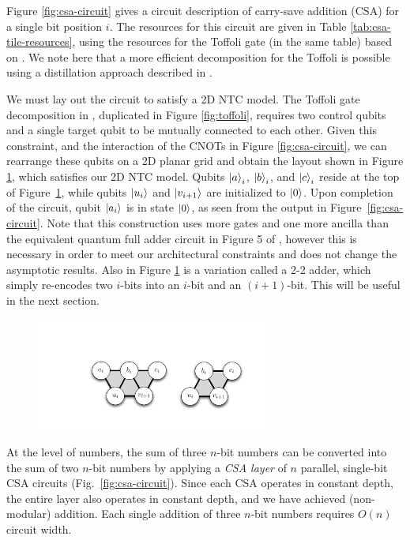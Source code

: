 \documentclass[twoside]{article}
\begin{document}
Figure \ref{fig:csa-circuit} gives a circuit description of carry-save addition (CSA) for a single bit position $i$.
The resources for this circuit are given in Table \ref{tab:csa-tile-resources}, using
the resources for the Toffoli gate (in the same table) based on
\cite{Amy2012}. We note here
that a more efficient decomposition for the Toffoli is possible using a
distillation approach described in \cite{Jones2013a}.

We must lay out the circuit to satisfy a 2D NTC model.
The Toffoli gate decomposition in \cite{Amy2012}, duplicated in
Figure \ref{fig:toffoli}, requires two control
qubits and a single target qubit to be
mutually connected to each other. Given this constraint, and the
interaction of the CNOTs in Figure \ref{fig:csa-circuit}, we can
rearrange these qubits on a 2D planar grid and obtain the layout shown
in Figure \ref{fig:csa-3-2}, which satisfies our 2D NTC model.
Qubits $\left\vert{a}\right\rangle_i$, $\left\vert{b}\right\rangle_i$, and $\left\vert{c}\right\rangle_i$ reside at the top of Figure~\ref{fig:csa-3-2}, while qubits $\left\vert{u_i}\right\rangle$ and $\left\vert{v_{i+1}}\right\rangle$ are initialized to $\left\vert{0}\right\rangle$.
Upon completion of the circuit, qubit $\left\vert{a_i}\right\rangle$ is in state $\left\vert{0}\right\rangle$, as seen from the output in Figure~\ref{fig:csa-circuit}. 
Note that this construction uses more gates and one more ancilla than the equivalent
quantum full adder circuit in Figure 5 of \cite{Gossett1998}, however this
is necessary in order to meet our architectural constraints and does not change the
asymptotic results.
Also in Figure \ref{fig:csa-3-2}
is a variation called a 2-2 adder, which simply re-encodes two $i$-bits
into an $i$-bit and an $(i+1)$-bit. This will be useful in the next section.

\begin{figure}[b!]
\begin{center}
\includegraphics[width=3in]{./csa-32-22.pdf}
\end{center}
\label{fig:csa-3-2}
\end{figure}

At the level of numbers, the sum of three $n$-bit numbers can be converted into
the sum of two $n$-bit numbers by applying a \emph{CSA layer} of
$n$ parallel, single-bit
CSA circuits (Fig.~\ref{fig:csa-circuit}). Since each CSA operates in constant depth, the entire layer also
operates in constant depth, and we have achieved (non-modular) addition.
%
Each single addition of three $n$-bit numbers requires $O(n)$ circuit width.
\end{document}
